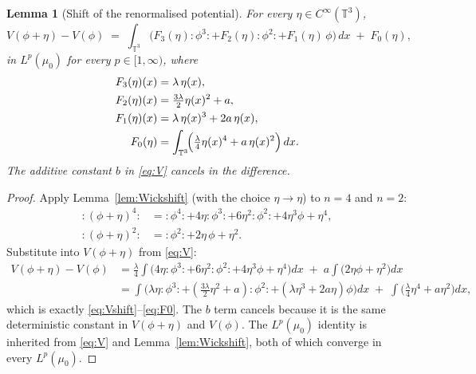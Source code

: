 \documentclass[12pt]{article}
\newtheorem{lemma}[theorem]{Lemma}
\theoremstyle{definition}
\begin{document}
\begin{lemma}[Shift of the renormalised potential]\label{lem:Vshift}
For every $\eta\in C^\infty(\mathbb{T}^3)$,
\begin{equation}\label{eq:Vshift}
V(\phi+\eta)-V(\phi) \;=\; \int_{\mathbb{T}^3}\bigl(F_3(\eta)\colon\!\phi^3\!\colon
+ F_2(\eta)\colon\!\phi^2\!\colon + F_1(\eta)\,\phi\bigr)\,dx \;+\; F_0(\eta),
\end{equation}
in $L^p(\mu_0)$ for every $p\in[1,\infty)$, where
\begin{align}
F_3(\eta)(x) &= \lambda\,\eta(x), \label{eq:F3}\\
F_2(\eta)(x) &= \tfrac{3\lambda}{2}\eta(x)^2 + a, \label{eq:F2}\\
F_1(\eta)(x) &= \lambda\,\eta(x)^3 + 2a\,\eta(x), \label{eq:F1}\\
F_0(\eta) &= \int_{\mathbb{T}^3}\!\Bigl(\tfrac{\lambda}{4}\eta(x)^4 + a\,\eta(x)^2\Bigr)\,dx. \label{eq:F0}
\end{align}
The additive constant $b$ in \eqref{eq:V} cancels in the difference.
\end{lemma}

\begin{proof}
Apply Lemma~\ref{lem:Wickshift} (with the choice $\eta\to\eta$) to $n=4$ and $n=2$:
\begin{align*}
\colon\!(\phi+\eta)^4\!\colon &= \colon\!\phi^4\!\colon + 4\eta\colon\!\phi^3\!\colon
+ 6\eta^2\colon\!\phi^2\!\colon + 4\eta^3\phi + \eta^4,\\
\colon\!(\phi+\eta)^2\!\colon &= \colon\!\phi^2\!\colon + 2\eta\,\phi + \eta^2.
\end{align*}
Substitute into $V(\phi+\eta)$ from \eqref{eq:V}:
\begin{align*}
V(\phi+\eta)-V(\phi)
&= \tfrac{\lambda}{4}\!\int\!\bigl(4\eta\colon\!\phi^3\!\colon + 6\eta^2\colon\!\phi^2\!\colon + 4\eta^3\phi + \eta^4\bigr)dx
\;+\; a\!\int\!\bigl(2\eta\phi + \eta^2\bigr)dx \\
&= \int\!\bigl(\lambda\eta\colon\!\phi^3\!\colon
+ (\tfrac{3\lambda}{2}\eta^2+a)\colon\!\phi^2\!\colon
+ (\lambda\eta^3+2a\eta)\phi\bigr)dx
\;+\; \int\!\bigl(\tfrac{\lambda}{4}\eta^4+a\eta^2\bigr)dx,
\end{align*}
which is exactly \eqref{eq:Vshift}--\eqref{eq:F0}. The $b$ term cancels because it is the
same deterministic constant in $V(\phi+\eta)$ and $V(\phi)$. The $L^p(\mu_0)$ identity is
inherited from \eqref{eq:V} and Lemma~\ref{lem:Wickshift}, both of which converge in every
$L^p(\mu_0)$.
\end{proof}
\end{document}
